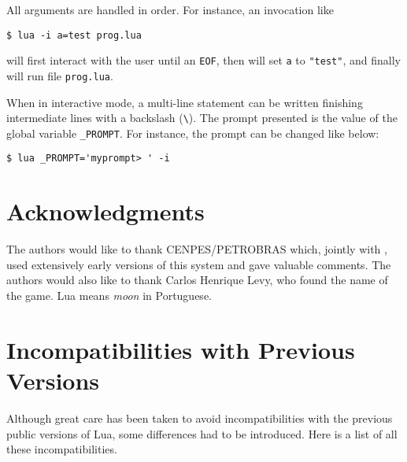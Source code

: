 All arguments are handled in order.
For instance, an invocation like
\begin{verbatim}
$ lua -i a=test prog.lua
\end{verbatim}
will first interact with the user until an \verb|EOF|,
then will set \verb|a| to \verb|"test"|,
and finally will run file \verb|prog.lua|.

When in interactive mode,
a multi-line statement can be written finishing intermediate
lines with a backslash (\verb|\|).
The prompt presented is the value of the global variable \verb|_PROMPT|.
For instance, the prompt can be changed like below:
\begin{verbatim}
$ lua _PROMPT='myprompt> ' -i
\end{verbatim}

\section*{Acknowledgments}

The authors would like to thank CENPES/PETROBRAS which,
jointly with \tecgraf, used extensively early versions of
this system and gave valuable comments.
The authors would also like to thank Carlos Henrique Levy,
who found the name of the game.
Lua means \emph{moon} in Portuguese.



\appendix

\section*{Incompatibilities with Previous Versions}

Although great care has been taken to avoid incompatibilities with
the previous public versions of Lua,
some differences had to be introduced.
Here is a list of all these incompatibilities.

